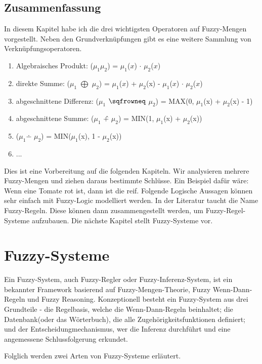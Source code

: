 \subsection{Zusammenfassung}

In diesem Kapitel habe ich die drei wichtigsten Operatoren auf Fuzzy-Mengen vorgestellt. Neben den Grundverknüpfungen gibt es eine weitere Sammlung von Verknüpfungsoperatoren.

\begin{enumerate}
	\item Algebraisches Produkt: ($\mu_1$$\mu_2$) = $\mu_1$($x$) $\cdot$ $\mu_2$($x$)
	\item direkte Summe: ($\mu_1$ $\bigoplus$ $\mu_2$) = $\mu_1$($x$) + $\mu_2$(x) - $\mu_1$($x$) $\cdot$ $\mu_2$($x$)
	\item abgeschnittene Differenz: ($\mu_1$ $\sqfrowneq$ $\mu_2$) = MAX(0, $\mu_1$(x) + $\mu_2$(x) - 1)
	\item abgeschnittene Summe: ($\mu_1$ \^{+} $\mu_2$) = MIN(1, $\mu_1$(x) + $\mu_2$(x))
	\item ($\mu_1$$\dotminus$ $\mu_2$) = MIN($\mu_1$(x), 1 - $\mu_2$(x))
	\item ...
\end{enumerate}

Dies ist eine Vorbereitung auf die folgenden Kapiteln. Wir analysieren mehrere Fuzzy-Mengen und ziehen daraus bestimmte Schlüsse. Ein Beispiel dafür wäre: Wenn eine Tomate rot ist, dann ist die reif. Folgende Logische Aussagen können sehr einfach mit Fuzzy-Logic modelliert werden. In der Literatur taucht die Name Fuzzy-Regeln. Diese können dann zusammengestellt werden, um Fuzzy-Regel-Systeme aufzubauen. Die nächste Kapitel stellt Fuzzy-Systeme vor. 

\section{Fuzzy-Systeme}

Ein Fuzzy-System, auch Fuzzy-Regler oder Fuzzy-Inferenz-System, ist ein bekannter Framework basierend auf Fuzzy-Mengen-Theorie, Fuzzy Wenn-Dann-Regeln und Fuzzy Reasoning. Konzeptionell besteht ein Fuzzy-System aus drei Grundteile - die Regelbasis, welche die Wenn-Dann-Regeln beinhaltet; die Datenbank(oder das Wörterbuch), die alle Zugehörigkeitsfunktionen definiert; und der Entscheidungmechanismus, wer die Inferenz durchführt und eine angemessene Schlussfolgerung erkundet.   

Folglich werden zwei Arten von Fuzzy-Systeme erläutert.

